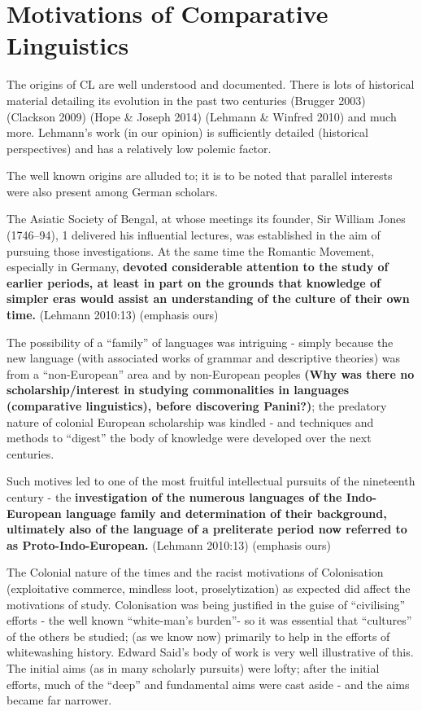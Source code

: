 \section*{Motivations of Comparative Linguistics}

The origins of CL are well understood and documented. There is lots of historical material detailing its evolution in the past two centuries (Brugger 2003) (Clackson 2009) (Hope \& Joseph 2014) (Lehmann \& Winfred 2010) and much more. Lehmann’s work (in our opinion) is sufficiently detailed (historical perspectives) and has a relatively low polemic factor.

The well known origins are alluded to; it is to be noted that parallel interests were also present among German scholars.

\begin{myquote}
The Asiatic Society of Bengal, at whose meetings its founder, Sir William Jones (1746–94), 1 delivered his influential lectures, was established in the aim of pursuing those investigations. At the same time the Romantic Movement, especially in Germany, \textbf{devoted considerable attention to the study of earlier periods, at least in part on the grounds that knowledge of simpler eras would assist an understanding of the culture of their own time.} (Lehmann 2010:13) (emphasis ours)
\end{myquote}

The possibility of a “family” of languages was intriguing - simply because the new language (with associated works of grammar and descriptive theories) was from a “non-European” area and by non-European peoples \textbf{(Why was there no scholarship/interest in studying commonalities in languages (comparative linguistics), before discovering Panini?)}; the predatory nature of colonial European scholarship was kindled - and techniques and methods to “digest” the body of knowledge were developed over the next centuries.

\begin{myquote}
Such motives led to one of the most fruitful intellectual pursuits of the nineteenth century - the \textbf{investigation of the numerous languages of the Indo-European language family and determination of their background, ultimately also of the language of a preliterate period now referred to as Proto-Indo-European. } (Lehmann 2010:13) (emphasis ours)
\end{myquote}

The Colonial nature of the times and the racist motivations of Colonisation (exploitative commerce, mindless loot, proselytization) as expected did affect the motivations of study. Colonisation was being justified in the guise of “civilising” efforts - the well known “white-man’s burden”- so it was essential that “cultures” of the others be studied; (as we know now) primarily to help in the efforts of whitewashing history. Edward Said’s body of work is very well illustrative of this. The initial aims (as in many scholarly pursuits) were lofty; after the initial efforts, much of the “deep” and fundamental aims were cast aside - and the aims became far narrower.

